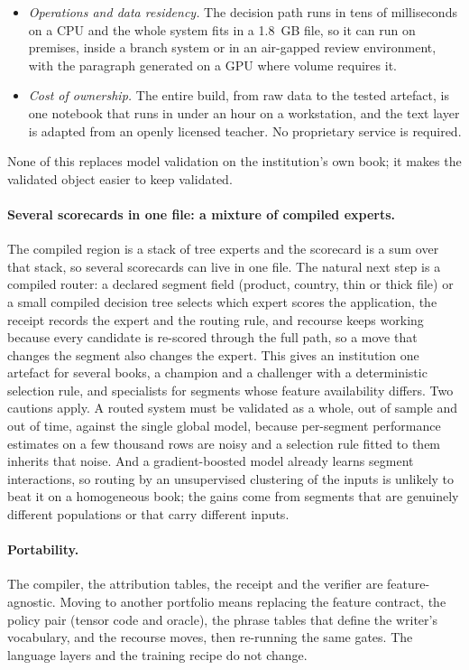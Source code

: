\documentclass[twocolumn,10pt]{article}
\begin{document}
\begin{itemize}
  before any model code runs; a modified file refuses to score. The language layers have no path to the number.
\item \emph{Operations and data residency.} The decision path runs in tens of milliseconds on a CPU and the whole system
  fits in a 1.8~GB file, so it can run on premises, inside a branch system or in an air-gapped review environment, with
  the paragraph generated on a GPU where volume requires it.
\item \emph{Cost of ownership.} The entire build, from raw data to the tested artefact, is one notebook that runs in under
  an hour on a workstation, and the text layer is adapted from an openly licensed teacher. No proprietary service is
  required.
\end{itemize}

None of this replaces model validation on the institution's own book; it makes the validated object easier to keep
validated.

\paragraph{Several scorecards in one file: a mixture of compiled experts.} The compiled region is a stack of tree
experts and the scorecard is a sum over that stack, so several scorecards can live in one file. The natural next step is a
compiled router: a declared segment field (product, country, thin or thick file) or a small compiled decision tree selects
which expert scores the application, the receipt records the expert and the routing rule, and recourse keeps working
because every candidate is re-scored through the full path, so a move that changes the segment also changes the expert.
This gives an institution one artefact for several books, a champion and a challenger with a deterministic selection rule,
and specialists for segments whose feature availability differs. Two cautions apply. A routed system must be validated as
a whole, out of sample and out of time, against the single global model, because per-segment performance estimates on a
few thousand rows are noisy and a selection rule fitted to them inherits that noise. And a gradient-boosted model already
learns segment interactions, so routing by an unsupervised clustering of the inputs is unlikely to beat it on a homogeneous
book; the gains come from segments that are genuinely different populations or that carry different inputs.

\paragraph{Portability.} The compiler, the attribution tables, the receipt and the verifier are feature-agnostic. Moving to
another portfolio means replacing the feature contract, the policy pair (tensor code and oracle), the phrase tables that
define the writer's vocabulary, and the recourse moves, then re-running the same gates. The language layers and the
training recipe do not change.
\end{document}

